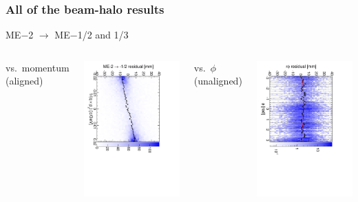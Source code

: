 \documentclass[compress]{beamer}
\begin{document}
\begin{frame}
\frametitle{All of the beam-halo results}

\begin{center}
ME$-$2 $\to$ ME$-$1/2 and 1/3
\end{center}

\begin{columns}
\centering vs.\ momentum (aligned)

\includegraphics[height=\linewidth, angle=90]{linear_mem2to1outer.pdf}

\centering vs.\ $\phi$ (unaligned)

\includegraphics[height=\linewidth, angle=90]{diskiter01_m2to1outer.pdf}


\end{columns}
\end{frame}
\end{document}
